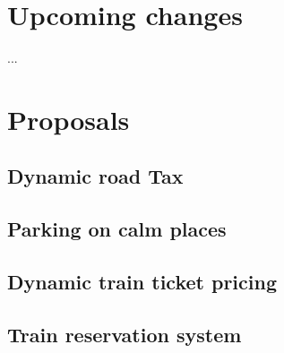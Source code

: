 \section{Upcoming changes}
...
\section{Proposals}
\subsection{Dynamic road Tax}
\subsection{Parking on calm places}
\subsection{Dynamic train ticket pricing}
\subsection{Train reservation system}

